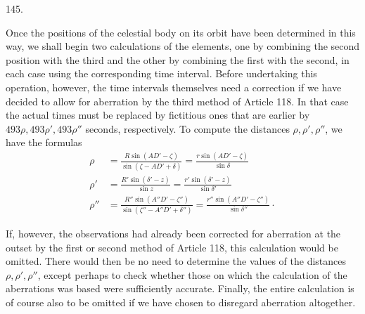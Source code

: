 \par{}\medskip
{}\begin{center}\hypertarget{native-196-article145}{}145.\end{center}
Once the positions of the celestial body on its orbit have been determined in this way, we shall begin two calculations of the elements, one by combining the second position with the third and the other by combining the first with the second, in each case using the corresponding time interval. Before undertaking this operation, however, the time intervals themselves need a correction if we have decided to allow for aberration by the third method of Article 118. In that case the actual times must be replaced by fictitious ones that are earlier by $493\rho,493\rho',493\rho''$ seconds, respectively. To compute the distances $\rho,\rho',\rho''$, we have the formulas
\[
\begin{aligned}
\rho&=\frac{R\sin(AD'-\zeta)}{\sin(\zeta-AD'+\delta)}=\frac{r\sin(AD'-\zeta)}{\sin\delta}\\[3pt]
\rho'&=\frac{R'\sin(\delta'-z)}{\sin z}=\frac{r'\sin(\delta'-z)}{\sin\delta'}\\[3pt]
\rho''&=\frac{R''\sin(A''D'-\zeta'')}{\sin(\zeta''-A''D'+\delta'')}=\frac{r''\sin(A''D'-\zeta'')}{\sin\delta''}\mathpunct{\cdot}
\end{aligned}
\]

If, however, the observations had already been corrected for aberration at the outset by the first or second method of Article 118, this calculation would be omitted. There would then be no need to determine the values of the distances $\rho,\rho',\rho''$, except perhaps to check whether those on which the calculation of the aberrations was based were sufficiently accurate. Finally, the entire calculation is of course also to be omitted if we have chosen to disregard aberration altogether.
